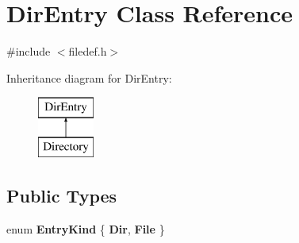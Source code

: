 \hypertarget{class_dir_entry}{}\section{Dir\+Entry Class Reference}
\label{class_dir_entry}


{\ttfamily \#include $<$filedef.\+h$>$}

Inheritance diagram for Dir\+Entry\+:\begin{figure}[H]
\begin{center}
\leavevmode
\includegraphics[height=2.000000cm]{class_dir_entry}
\end{center}
\end{figure}
\subsection*{Public Types}
\begin{DoxyCompactItemize}
\item 
\mbox{\label{class_dir_entry_a1edafe219ba585326221f2fbe66afaf0}} 
enum {\bfseries Entry\+Kind} \{ {\bfseries Dir}, 
{\bfseries File}
 \}
\end{DoxyCompactItemize}
